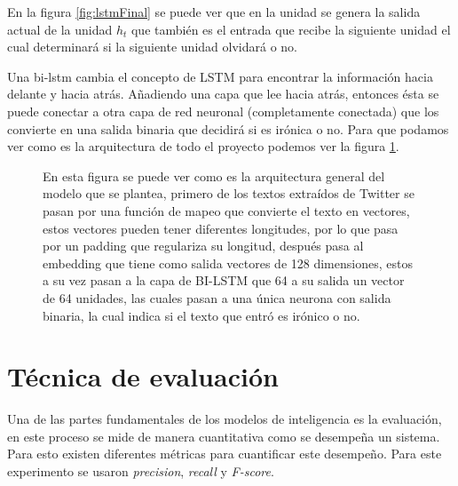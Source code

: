 \par En la figura \ref{fig:lstmFinal} se puede ver que en la unidad se genera la salida actual de la unidad $h_t$ que también es el entrada que recibe la siguiente unidad el cual determinará si la siguiente unidad olvidará o no.

\par Una \gls{bi-lstm} cambia el concepto de LSTM para encontrar la información hacia delante y hacia atrás. Añadiendo una capa que lee hacia atrás, entonces ésta se puede conectar a otra capa de red neuronal (completamente conectada) que los convierte en una salida binaria que decidirá si es irónica o no. Para que podamos ver como es la arquitectura de todo el proyecto podemos ver la figura \ref{fig:arquitectura}.

\begin{landscape}

	\begin{figure}
		\centering
		
		\caption{En esta figura se puede ver como es la arquitectura general del modelo que se plantea, primero de los textos extraídos de Twitter se pasan por una función de mapeo que convierte el texto en vectores, estos vectores pueden tener diferentes longitudes, por lo que pasa por un \gls{padding} que regulariza su longitud, después pasa al embedding que tiene como salida vectores de 128 dimensiones, estos a su vez pasan a la capa de BI-LSTM que 64 a su salida un vector de 64 unidades, las cuales pasan a una única neurona con salida binaria, la cual indica si el texto que entró es irónico o no.}
		\label{fig:arquitectura}
	\end{figure}
\end{landscape}

\section{Técnica de evaluación}

\par Una de las partes fundamentales de los modelos de inteligencia es la evaluación, en este proceso se mide de manera cuantitativa como se desempeña un sistema. Para esto existen diferentes métricas para cuantificar este desempeño. Para este experimento se usaron \textit{precision}, \textit{recall} y \textit{F-score}.

